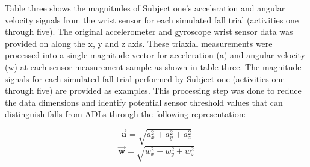 \documentclass{llncs}
\begin{document}
Table three shows the magnitudes of Subject one's acceleration and angular velocity signals from the wrist sensor for each simulated fall trial (activities one through five). The original accelerometer and gyroscope wrist sensor data was provided on along the x, y and z axis. These triaxial measurements were processed into a single magnitude vector for acceleration (a) and angular velocity (w) at each sensor measurement sample as shown in table three. The magnitude signals for each simulated fall trial performed by Subject one (activities one through five) are provided as examples. This processing step was done to reduce the data dimensions and identify potential sensor threshold values that can distinguish falls from ADLs through the following representation:
	
\begin{equation*}
    	\vec{\mathbf{a}} = \sqrt{a_{x}^2 + a_{y}^2 + a_{z}^2}
\end{equation*} 
\begin{equation*}
	\vec{\mathbf{w}} = \sqrt{w_{x}^2 + w_{y}^2 + w_{z}^2}
\end{equation*} 
	
\end{document}
